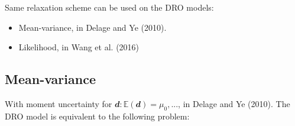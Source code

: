 \documentclass[
  a4paper,
,tablecaptionabove
]{scrartcl}
\numberwithin{equation}{section}
\providecommand{\tightlist}{%
  \setlength{\itemsep}{0pt}\setlength{\parskip}{0pt}}
\begin{document}
Same relaxation scheme can be used on the DRO models:

\begin{itemize}
  \tightlist
  \item
        Mean-variance, in Delage and Ye (2010).
  \item
        Likelihood, in Wang et al. (2016)
\end{itemize}

\hypertarget{sec:mean-variance}{%
  \subsection{Mean-variance}\label{mean-variance}}

With moment uncertainty for
\(\mathbfit d: \mathbb{E}(\mathbfit d) = \mu_0, ...\), in Delage and
Ye (2010). The DRO model is equivalent to the following problem:
\end{document}
